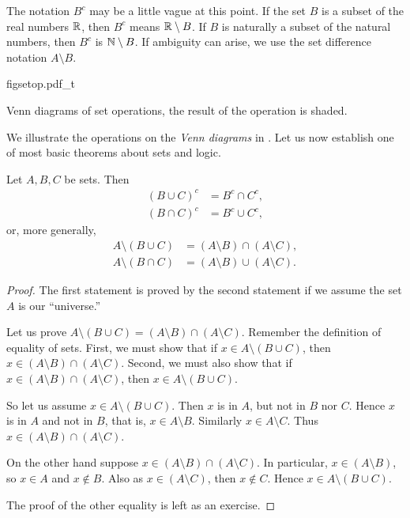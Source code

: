 The notation $B^c$ may be a little vague at this point.  If
the set $B$ is a subset of the real numbers ${\mathbb{R}}$, then $B^c$ means
${\mathbb{R}} \setminus B$.  If $B$ is naturally a subset of the natural numbers,
then $B^c$
is ${\mathbb{N}} \setminus B$.  If ambiguity can arise, we 
use the set difference notation $A \setminus B$.

\begin{myfigureht}
{figsetop.pdf_t}
\caption{Venn diagrams of set operations, the result of the operation is
shaded.\label{figsetop}}
\end{myfigureht}
We illustrate the operations on the
\emph{Venn diagrams} in .
Let us now establish one of most basic theorems about sets and logic.

\begin{thm}[DeMorgan]
Let $A, B, C$ be sets.  Then
\begin{align*}
{(B \cup C)}^c &= B^c \cap C^c , \\
{(B \cap C)}^c &= B^c \cup C^c ,
\end{align*}
or, more generally,
\begin{align*}
A \setminus (B \cup C) &= (A \setminus B) \cap (A \setminus C) , \\
A \setminus (B \cap C) &= (A \setminus B) \cup (A \setminus C) .
\end{align*}
\end{thm}

\begin{proof}
The first statement is proved by the second statement if we
assume the set $A$ is our ``universe.''

Let us prove $A \setminus (B \cup C) = (A \setminus B) \cap (A \setminus C)$.
Remember the definition of equality of sets.  First, we must show that
if $x \in A \setminus (B \cup C)$, then
$x \in (A \setminus B) \cap (A \setminus C)$.  Second, we must also show that
if $x \in (A \setminus B) \cap (A \setminus C)$, then
$x \in A \setminus (B \cup C)$.

So let us assume $x \in A \setminus (B \cup C)$.  Then $x$ is in 
$A$, but not in $B$ nor $C$.  Hence $x$ is in $A$ and not in $B$, that is,
$x \in A \setminus B$.  Similarly $x \in A \setminus C$.  Thus
$x \in (A \setminus B) \cap (A \setminus C)$.

On the other hand suppose 
$x \in (A \setminus B) \cap (A \setminus C)$.  In particular,
$x \in (A \setminus B)$, so 
$x \in A$ and $x \notin B$.  Also as $x \in (A \setminus C)$, then $x \notin C$.
Hence $x \in A \setminus (B \cup C)$.

The proof of the other equality is left as an exercise.
\end{proof}

